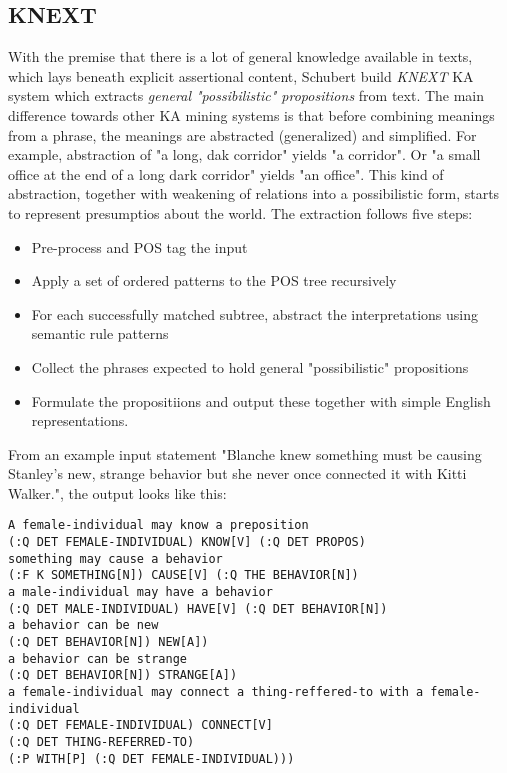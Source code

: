 \subsection{KNEXT}
\label{section_rw:KNEXT}
With the premise that there is a lot of general knowledge available in texts,
which lays beneath explicit assertional content, Schubert build \emph{KNEXT} KA
system\parencite{Schubert2002} which extracts \emph{general "possibilistic"
propositions} from text. The main difference towards other KA mining systems is
that before combining meanings from a phrase, the meanings are abstracted
(generalized) and simplified. For example, abstraction of "a long, dak corridor"
yields "a corridor". Or "a small office at the end of a long dark corridor" 
yields "an office". This kind of abstraction, together with weakening of 
relations into a possibilistic form, starts to represent presumptios about the
world. 
The extraction follows five steps:
\begin{itemize}
    \item Pre-process and POS tag the input
    \item Apply a set of ordered patterns to the POS tree recursively
    \item For each successfully matched subtree, abstract the interpretations
          using semantic rule patterns
    \item Collect the phrases expected to hold general "possibilistic" 
        propositions
    \item Formulate the propositiions and output these together with simple
        English representations.
\end{itemize}
From an example input statement "Blanche knew something must be causing 
Stanley's new, strange behavior but she never once connected it with Kitti 
Walker.", the output looks like this:

\lstset{breaklines=true}
\begin{lstlisting}
A female-individual may know a preposition 
(:Q DET FEMALE-INDIVIDUAL) KNOW[V] (:Q DET PROPOS) 
something may cause a behavior
(:F K SOMETHING[N]) CAUSE[V] (:Q THE BEHAVIOR[N])
a male-individual may have a behavior
(:Q DET MALE-INDIVIDUAL) HAVE[V] (:Q DET BEHAVIOR[N])
a behavior can be new
(:Q DET BEHAVIOR[N]) NEW[A])
a behavior can be strange
(:Q DET BEHAVIOR[N]) STRANGE[A])
a female-individual may connect a thing-reffered-to with a female-individual
(:Q DET FEMALE-INDIVIDUAL) CONNECT[V] 
(:Q DET THING-REFERRED-TO) 
(:P WITH[P] (:Q DET FEMALE-INDIVIDUAL)))
\end{lstlisting}

